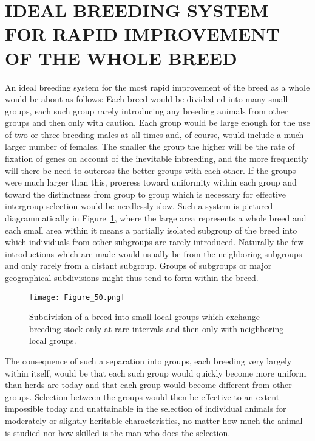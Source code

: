 \section*{IDEAL BREEDING SYSTEM FOR RAPID IMPROVEMENT OF THE WHOLE BREED}

An ideal breeding system for the most rapid improvement of the
breed as a whole would be about as follows: Each breed would be divided
ed into many small groups, each such group rarely introducing any
breeding animals from other groups and then only with caution. Each
group would be large enough for the use of two or three breeding males
at all times and, of course, would include a much larger number of
females. The smaller the group the higher will be the rate of fixation
of genes on account of the inevitable inbreeding, and the more frequently
will there be need to outcross the better groups with each other.
If the groups were much larger than this, progress toward uniformity
within each group and toward the distinctness from group to group
which is necessary for effective intergroup selection would be needlessly
slow. Such a system is pictured diagrammatically in
Figure~\ref{fig:Lush_Figure_50}, where the large area represents a whole
breed and each small area within it means a partially isolated subgroup of
the breed into which individuals from other subgroups are rarely introduced.
Naturally the few introductions which are made would usually be from the
neighboring subgroups and only rarely from a distant subgroup. Groups of
subgroups or major geographical subdivisions might thus tend to form within
the breed.

\begin{figure}
	\centering
    \texttt{[image: Figure\_50.png]}
    \caption{Subdivision of a breed into small local groups which exchange breeding
			 stock only at rare intervals and then only with neighboring local groups.}
    \label{fig:Lush_Figure_50}
\end{figure}

The consequence of such a separation into groups, each breeding
very largely within itself, would be that each such group would quickly
become more uniform than herds are today and that each group would
become different from other groups. Selection between the groups
would then be effective to an extent impossible today and unattainable
in the selection of individual animals for moderately or slightly heritable
characteristics, no matter how much the animal is studied nor how
skilled is the man who does the selection.

